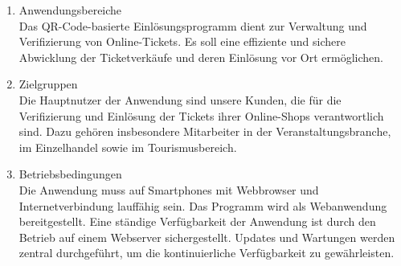 \begin{enumerate}[itemsep=0em,partopsep=0em,parsep=0em,topsep=0em]
    \item Anwendungsbereiche\\
    Das QR-Code-basierte Einlösungsprogramm dient zur Verwaltung und Verifizierung von Online-Tickets. Es soll eine effiziente und sichere Abwicklung der Ticketverkäufe und deren Einlösung vor Ort ermöglichen.

    \item Zielgruppen\\
    Die Hauptnutzer der Anwendung sind unsere Kunden, die für die Verifizierung und Einlösung der Tickets ihrer Online-Shops verantwortlich sind. Dazu gehören insbesondere Mitarbeiter in der Veranstaltungsbranche, im Einzelhandel sowie im Tourismusbereich.

    \item Betriebsbedingungen\\
    Die Anwendung muss auf Smartphones mit Webbrowser und Internetverbindung lauffähig sein. Das Programm wird als Webanwendung bereitgestellt. Eine ständige Verfügbarkeit der Anwendung ist durch den Betrieb auf einem Webserver sichergestellt. Updates und Wartungen werden zentral durchgeführt, um die kontinuierliche Verfügbarkeit zu gewährleisten.
\end{enumerate}